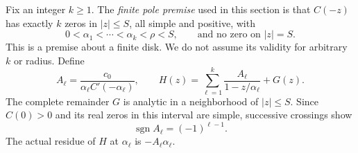 Fix an integer $k\ge1$.  The \emph{finite pole premise} used in this
section is that $C(-z)$ has exactly $k$ zeros in $|z|\le S$, all simple
and positive, with
\begin{equation}
 0<\alpha_1<\cdots<\alpha_k<\rho<S,
 \qquad\text{and no zero on }|z|=S.
 \label{rgd:packet}
\end{equation}
This is a premise about a finite disk.  We do not assume its validity
for arbitrary $k$ or radius.  Define
\begin{equation}
 A_\ell=\frac{c_0}{\alpha_\ell C'(-\alpha_\ell)},\qquad
 H(z)=\sum_{\ell=1}^k\frac{A_\ell}{1-z/\alpha_\ell}+G(z).
 \label{rgd:partial-fractions}
\end{equation}
The complete remainder $G$ is analytic in a neighborhood of $|z|\le S$.
Since $C(0)>0$ and its real zeros in this interval are simple,
successive crossings show
\begin{equation}
 \operatorname{sgn}A_\ell=(-1)^{\ell-1}.
 \label{rgd:residue-sign}
\end{equation}
The actual residue of $H$ at $\alpha_\ell$ is $-A_\ell\alpha_\ell$.

